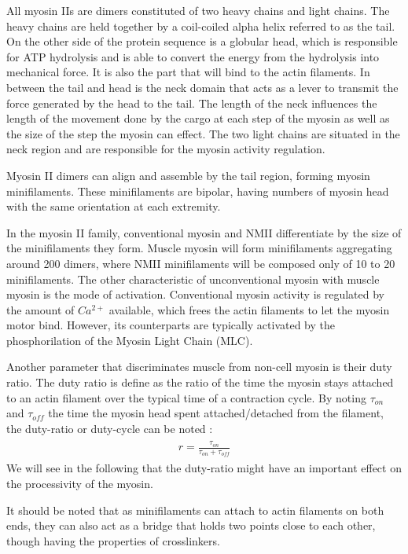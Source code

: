 \documentclass[A4paperpaper,11pt,english]{sphinxmanual}
\begin{document}
All myosin IIs are dimers constituted of two heavy chains and light chains. The
heavy chains are held together by a coil-coiled alpha helix referred to as the
tail. On the other side of the protein sequence is a globular head, which is
responsible for ATP hydrolysis and is able to convert the energy from the
hydrolysis into mechanical force. It is also the part that will bind to the
actin filaments. In between the tail and head is the neck domain that acts as a
lever to transmit the force generated by the head to the tail. The length of
the neck influences the length of the movement done by the cargo at each step of
the myosin as well as the size of the step the myosin can effect. The two light
chains are situated in the neck region and are responsible for the myosin
activity regulation.

Myosin II dimers can align and assemble by the tail region, forming myosin
minifilaments. These minifilaments are bipolar, having numbers of myosin head
with the same orientation at each extremity.

In the myosin II family, conventional myosin and NMII differentiate by the
size of the minifilaments they form. Muscle myosin will form minifilaments
aggregating around 200 dimers, where NMII minifilaments will be composed  only
of 10 to 20 minifilaments. The other characteristic of unconventional myosin
with muscle myosin is the mode of activation. Conventional myosin activity is
regulated by the amount of \(Ca^{2+}\) available, which frees the actin filaments to let the myosin motor bind. However, its
counterparts are typically activated by the phosphorilation of the Myosin Light Chain (MLC).

Another parameter that discriminates muscle from non-cell myosin is their duty
ratio.  The duty ratio is define as the ratio of the time the myosin stays
attached to an actin filament over the typical time of a contraction cycle.
By noting \(\tau_{on}\) and \(\tau_{off}\) the time the myosin head
spent attached/detached from  the filament, the duty-ratio or duty-cycle can
be noted :
\label{index-latex:equation-roa2}\begin{gather}
\begin{split}r = \frac{\tau_{on}}{\tau_{on}+\tau_{off}}\end{split}\label{index-latex-roa2}
\end{gather}
We will see in the following that the duty-ratio might have an important effect
on the processivity of the myosin.

It should be noted that as minifilaments can attach to actin filaments on both
ends, they can also act as a bridge that holds two points close to each other,
though having the properties of crosslinkers.
\end{document}
